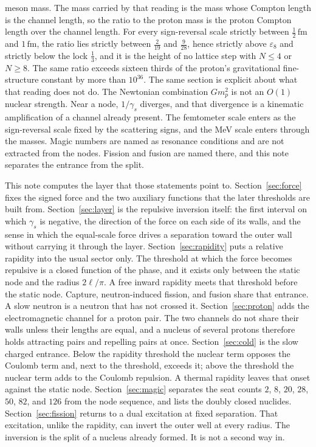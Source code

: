 \documentclass[a4paper]{article}
\begin{document}
meson mass. The mass carried by that reading is the mass whose Compton length is the channel length, so the ratio to the proton mass is the proton Compton length over the channel length. For every sign-reversal scale strictly between \(\tfrac12\,\mathrm{fm}\) and \(1\,\mathrm{fm}\), the ratio lies strictly between \(\tfrac{2}{19}\) and \(\tfrac{9}{28}\), hence strictly above \(\varepsilon_8\) and strictly below the lock \(\tfrac13\), and it is the height of no lattice step with \(N\le 4\) or \(N\ge 8\). The same ratio exceeds sixteen thirds of the proton's gravitational fine-structure constant by more than \(10^{36}\). The same section is explicit about what that reading does not do. The Newtonian combination \(G m_p^2\) is not an \(O(1)\) nuclear strength. Near a node, \(1/\gamma_s\) diverges, and that divergence is a kinematic amplification of a channel already present. The femtometer scale enters as the sign-reversal scale fixed by the scattering signs, and the MeV scale enters through the masses. Magic numbers are named as resonance conditions and are not extracted from the nodes. Fission and fusion are named there, and this note separates the entrance from the split.

This note computes the layer that those statements point to. Section~\ref{sec:force} fixes the signed force and the two auxiliary functions that the later thresholds are built from. Section~\ref{sec:layer} is the repulsive inversion itself: the first interval on which \(\gamma_s\) is negative, the direction of the force on each side of its walls, and the sense in which the equal-scale force drives a separation toward the outer wall without carrying it through the layer. Section~\ref{sec:rapidity} puts a relative rapidity into the usual sector only. The threshold at which the force becomes repulsive is a closed function of the phase, and it exists only between the static node and the radius \(2\ell/\pi\). A free inward rapidity meets that threshold before the static node. Capture, neutron-induced fission, and fusion share that entrance. A slow neutron is a neutron that has not crossed it. Section~\ref{sec:proton} adds the electromagnetic channel for a proton pair. The two channels do not share their walls unless their lengths are equal, and a nucleus of several protons therefore holds attracting pairs and repelling pairs at once. Section~\ref{sec:cold} is the slow charged entrance. Below the rapidity threshold the nuclear term opposes the Coulomb term and, next to the threshold, exceeds it; above the threshold the nuclear term adds to the Coulomb repulsion. A thermal rapidity leaves that onset against the static node. Section~\ref{sec:magic} separates the seat counts \(2\), \(8\), \(20\), \(28\), \(50\), \(82\), and \(126\) from the node sequence, and lists the doubly closed nuclides. Section~\ref{sec:fission} returns to a dual excitation at fixed separation. That excitation, unlike the rapidity, can invert the outer well at every radius. The inversion is the split of a nucleus already formed. It is not a second way in.
\end{document}
